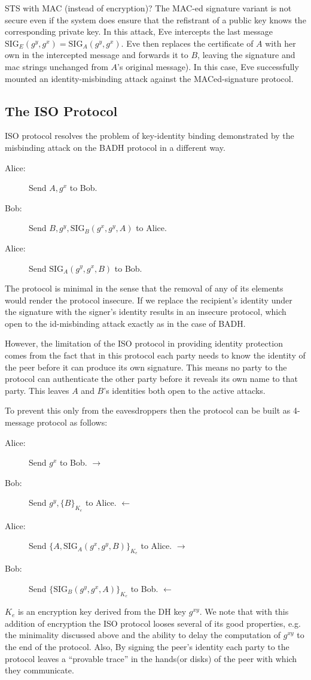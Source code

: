 \documentclass[11pt]{article}
\newcommand{\sig}{\text{SIG}}
\begin{document}
STS with MAC (instead of encryption)? The MAC-ed signature variant is not secure even if the system does ensure that the refistrant of a public key knows the corresponding private key. In this attack, Eve intercepts the last message $\sig_E(g^y, g^x) =  \sig_A(g^y, g^x)$. Eve then replaces the certificate of $A$ with her own in the intercepted message and forwards it to $B$, leaving the signature and mac strings unchanged from $A$'s
 original message). In this case, Eve successfully mounted an identity-misbinding attack against the MACed-signature protocol.
\subsection{The ISO Protocol}
ISO protocol resolves the problem of key-identity binding demonstrated by the misbinding attack on the BADH protocol in a different way. 
\begin{description}
\item[Alice:] Send $A, g^x$ to Bob.
\item[Bob:] Send $B, g^y,\sig_B(g^x, g^y, A)$ to Alice.
\item[Alice:] Send $\sig_{A}(g^y, g^x, B)$ to Bob.
\end{description}

The protocol is minimal in the sense that the removal of any of its elements would render the protocol insecure. If we replace the recipient's identity under the signature with the signer's identity results in an insecure protocol, which open to the id-misbinding attack exactly as in the case of BADH.

However, the limitation of the ISO protocol in providing identity protection comes from the fact that in this protocol each party needs to know the identity of the peer before it can produce its own signature. This means no party to the protocol can authenticate the other party before it reveals its own name to that party. This leaves $A$ and $B$'s identities both open to the active attacks.

To prevent this only from the eavesdroppers then the protocol can be built as 4-message protocol as follows:
\begin{description}
\item[Alice:] Send $g^x$ to Bob. $\longrightarrow$
\item[Bob:] Send $g^y, \{B\}_{K_e}$ to Alice.  $\longleftarrow$
\item[Alice:] Send $\{A,\sig_A(g^x, g^y, B)\}_{K_e}$ to Alice. $\longrightarrow$
\item[Bob:] Send $\{\sig_{B}(g^y, g^x, A)\}_{K_e}$ to Bob. $\longleftarrow$
\end{description}
$K_e$ is an encryption key derived from the DH key $g^{xy}$. We note that with this addition of encryption the ISO protocol looses several of its good properties, e.g. the minimality discussed above and the ability to delay the computation of $g^{xy}$ to the end of the protocol. Also, By signing the peer's identity each party to the protocol leaves a ``provable trace'' in the hands(or disks) of the peer with which they communicate.
\end{document}

